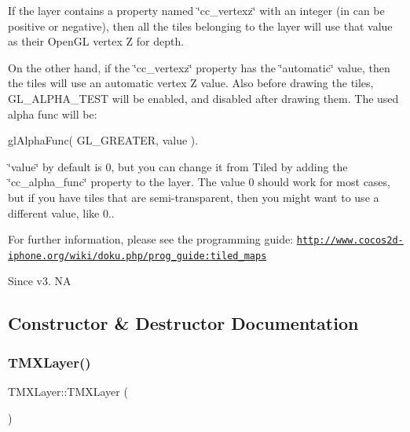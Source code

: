 If the layer contains a property named \char`\"{}cc\+\_\+vertexz\char`\"{} with an integer (in can be positive or negative), then all the tiles belonging to the layer will use that value as their Open\+GL vertex Z for depth.

On the other hand, if the \char`\"{}cc\+\_\+vertexz\char`\"{} property has the \char`\"{}automatic\char`\"{} value, then the tiles will use an automatic vertex Z value. Also before drawing the tiles, G\+L\+\_\+\+A\+L\+P\+H\+A\+\_\+\+T\+E\+ST will be enabled, and disabled after drawing them. The used alpha func will be\+:

gl\+Alpha\+Func( G\+L\+\_\+\+G\+R\+E\+A\+T\+E\+R, value ).

\char`\"{}value\char`\"{} by default is 0, but you can change it from Tiled by adding the \char`\"{}cc\+\_\+alpha\+\_\+func\char`\"{} property to the layer. The value 0 should work for most cases, but if you have tiles that are semi-\/transparent, then you might want to use a different value, like 0..

For further information, please see the programming guide\+: \href{http://www.cocos2d-iphone.org/wiki/doku.php/prog_guide:tiled_maps}{\tt http\+://www.\+cocos2d-\/iphone.\+org/wiki/doku.\+php/prog\+\_\+guide\+:tiled\+\_\+maps}

\begin{DoxySince}{Since}
v3.  NA 
\end{DoxySince}


\subsection{Constructor \& Destructor Documentation}
\mbox{\label{classexperimental_1_1TMXLayer_a24b45a43f69749ee9c63e94eb0bcad96}} 
\subsubsection{\texorpdfstring{T\+M\+X\+Layer()}{TMXLayer()}\hspace{0.1cm}{\footnotesize\ttfamily [1/2]}}
{\footnotesize\ttfamily T\+M\+X\+Layer\+::\+T\+M\+X\+Layer (\begin{DoxyParamCaption}{ }\end{DoxyParamCaption})}

